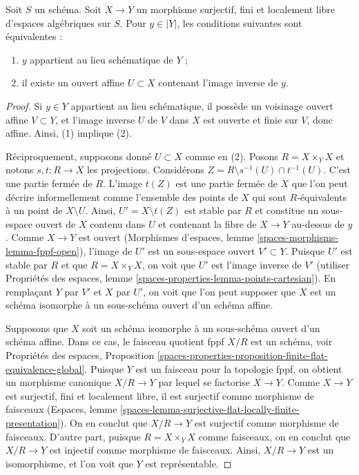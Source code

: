 \begin{lemma}
\label{lemma-when-quotient-scheme-at-point}
Soit $S$ un schéma. Soit $X \to Y$ un morphisme surjectif, fini et
localement libre d'espaces algébriques sur $S$. Pour $y \in |Y|$, les
conditions suivantes sont équivalentes :
\begin{enumerate}
\item $y$ appartient au lieu schématique de $Y$ ;
\item il existe un ouvert affine $U \subset X$ contenant l'image inverse
de $y$.
\end{enumerate}
\end{lemma}

\begin{proof}
Si $y \in Y$ appartient au lieu schématique, il possède un voisinage ouvert
affine $V \subset Y$, et l'image inverse $U$ de $V$ dans $X$ est ouverte et
finie sur $V$, donc affine. Ainsi, (1) implique (2).

\medskip\noindent
Réciproquement, supposons donné $U \subset X$ comme en (2).
Posons $R = X \times_Y X$ et notons $s, t : R \to X$ les projections.
Considérons $Z = R \setminus s^{-1}(U) \cap t^{-1}(U)$.
C'est une partie fermée de $R$. L'image $t(Z)$ est une partie fermée
de $X$ que l'on peut décrire informellement comme l'ensemble des
points de $X$ qui sont $R$-équivalents à un point de
$X \setminus U$. Ainsi, $U' = X \setminus t(Z)$ est stable par $R$ et
constitue un sous-espace ouvert de $X$ contenu dans $U$ et contenant
la fibre de $X \to Y$ au-dessus de $y$. Comme $X \to Y$ est ouvert
(Morphismes d'espaces, lemme \ref{spaces-morphisms-lemma-fppf-open}),
l'image de $U'$ est un sous-espace ouvert $V' \subset Y$.
Puisque $U'$ est stable par $R$ et que $R = X \times_Y X$, on voit que $U'$
est l'image inverse de $V'$ (utiliser
Propriétés des espaces, lemme \ref{spaces-properties-lemma-points-cartesian}).
En remplaçant $Y$ par $V'$ et $X$ par $U'$, on voit que l'on peut supposer
que $X$ est un schéma isomorphe à un sous-schéma ouvert d'un schéma affine.

\medskip\noindent
Supposons que $X$ soit un schéma isomorphe à un sous-schéma ouvert d'un
schéma affine. Dans ce cas, le faisceau quotient fppf $X/R$ est un schéma,
voir Propriétés des espaces, Proposition
\ref{spaces-properties-proposition-finite-flat-equivalence-global}.
Puisque $Y$ est un faisceau pour la topologie fppf, on obtient un morphisme
canonique $X/R \to Y$ par lequel se factorise $X \to Y$. Comme $X \to Y$ est
surjectif, fini et localement libre, il est surjectif comme morphisme de
faisceaux
(Espaces, lemme \ref{spaces-lemma-surjective-flat-locally-finite-presentation}).
On en conclut que $X/R \to Y$ est surjectif comme morphisme de faisceaux.
D'autre part, puisque $R = X \times_Y X$ comme faisceaux, on en conclut que
$X/R \to Y$ est injectif comme morphisme de faisceaux. Ainsi, $X/R \to Y$
est un isomorphisme, et l'on voit que $Y$ est représentable.
\end{proof}

